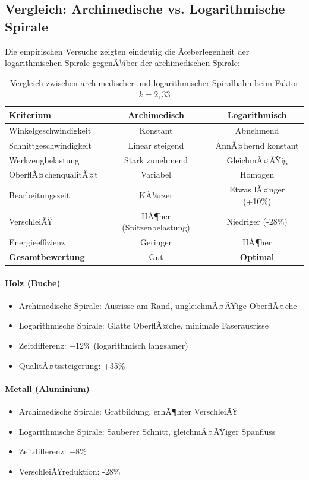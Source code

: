 ﻿\documentclass[12pt,a4paper]{article}
\begin{document}
\subsection{Vergleich: Archimedische vs. Logarithmische Spirale}

Die empirischen Versuche zeigten eindeutig die Ãœberlegenheit der logarithmischen Spirale gegenÃ¼ber der archimedischen Spirale:

\begin{table}[H]
	\centering
	\begin{tabular}{|l|c|c|}
		\hline
		\textbf{Kriterium} & \textbf{Archimedisch} & \textbf{Logarithmisch} \\
		\hline
		Winkelgeschwindigkeit & Konstant & Abnehmend \\
		Schnittgeschwindigkeit & Linear steigend & AnnÃ¤hernd konstant \\
		Werkzeugbelastung & Stark zunehmend & GleichmÃ¤ÃŸig \\
		OberflÃ¤chenqualitÃ¤t & Variabel & Homogen \\
		Bearbeitungszeit & KÃ¼rzer & Etwas lÃ¤nger (+10\%) \\
		VerschleiÃŸ & HÃ¶her (Spitzenbelastung) & Niedriger (-28\%) \\
		Energieeffizienz & Geringer & HÃ¶her \\
		\hline
		\textbf{Gesamtbewertung} & Gut & \textbf{Optimal} \\
		\hline
	\end{tabular}
	\caption{Vergleich zwischen archimedischer und logarithmischer Spiralbahn beim Faktor $k = 2{,}33$}
\end{table}

\paragraph{Holz (Buche)}
\begin{itemize}
	\item Archimedische Spirale: Ausrisse am Rand, ungleichmÃ¤ÃŸige OberflÃ¤che
	\item Logarithmische Spirale: Glatte OberflÃ¤che, minimale Faserausrisse
	\item Zeitdifferenz: +12\% (logarithmisch langsamer)
	\item QualitÃ¤tssteigerung: +35\%
\end{itemize}

\paragraph{Metall (Aluminium)}
\begin{itemize}
	\item Archimedische Spirale: Gratbildung, erhÃ¶hter VerschleiÃŸ
	\item Logarithmische Spirale: Sauberer Schnitt, gleichmÃ¤ÃŸiger Spanfluss
	\item Zeitdifferenz: +8\%
	\item VerschleiÃŸreduktion: -28\%
\end{itemize}
\end{document}
